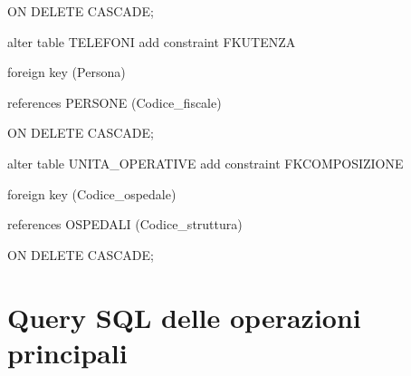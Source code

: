 \documentclass[a4paper,12pt]{report}
\begin{document}
     ON DELETE CASCADE; \newline

\noindent alter table TELEFONI add constraint FKUTENZA

     foreign key (Persona)

     references PERSONE (Codice\_fiscale)

     ON DELETE CASCADE; \newline

\noindent alter table UNITA\_OPERATIVE add constraint FKCOMPOSIZIONE

     foreign key (Codice\_ospedale)

     references OSPEDALI (Codice\_struttura)

     ON DELETE CASCADE; \newline

\appendix 
\chapter{Query SQL delle operazioni principali}
\end{document}
